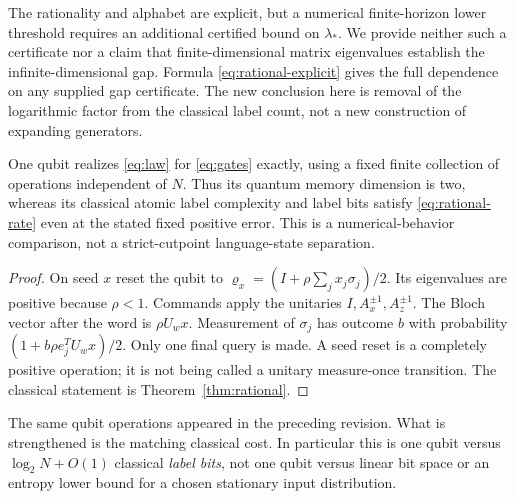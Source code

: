 The rationality and alphabet are explicit, but a numerical finite-horizon
lower threshold requires an additional certified bound on $\lambda_*$.
We provide neither such a certificate nor a claim that finite-dimensional
matrix eigenvalues establish the infinite-dimensional gap. Formula
\eqref{eq:rational-explicit} gives the full dependence on any supplied
gap certificate. The new conclusion here is removal of the logarithmic
factor from the classical label count, not a new construction of expanding
generators.

\begin{proposition}
\label{prop:qubit}
One qubit realizes \eqref{eq:law} for \eqref{eq:gates} exactly, using a
fixed finite collection of operations independent of $N$. Thus its quantum
memory dimension is two, whereas its classical atomic label complexity
and label bits satisfy \eqref{eq:rational-rate} even at the stated fixed
positive error. This is a numerical-behavior comparison, not a
strict-cutpoint language-state separation.
\end{proposition}
\begin{proof}
On seed $x$ reset the qubit to
$\varrho_x=(I+\rho\sum_jx_j\sigma_j)/2$. Its eigenvalues are positive
because $\rho<1$. Commands apply the unitaries
$I,A_x^{\pm1},A_z^{\pm1}$. The Bloch vector after the word is $\rho U_wx$.
Measurement of $\sigma_j$ has outcome $b$ with probability
$(1+b\rho e_j^TU_wx)/2$. Only one final query is made. A seed reset is a
completely positive operation; it is not being called a unitary
measure-once transition. The classical statement is
Theorem~\ref{thm:rational}.
\end{proof}

The same qubit operations appeared in the preceding revision. What is
strengthened is the matching classical cost. In particular this is one
qubit versus $\log_2N+O(1)$ classical \emph{label bits}, not one qubit
versus linear bit space or an entropy lower bound for a chosen stationary
input distribution.
